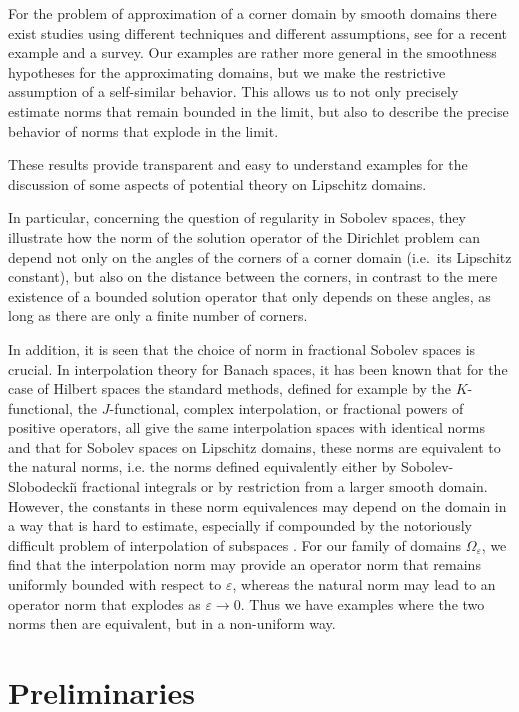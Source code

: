 \documentclass[titlepage,12pt]{amsart}
\theoremstyle{definition}
\theoremstyle{remark}
\numberwithin{equation}{section}
\begin{document}
For the problem of approximation of a corner domain by smooth domains there exist studies using different techniques and different assumptions, see \cite{DanielLabrunieNistor:2024} for a recent example and a survey. Our examples are rather more general in the smoothness hypotheses for the approximating domains, but we make the restrictive assumption of a self-similar behavior. This allows us to not only precisely estimate norms that remain bounded in the limit, but also to describe the precise behavior of norms that explode in the limit.

These results provide transparent and easy to understand examples for the discussion of some aspects of potential theory on Lipschitz domains. 

In particular, concerning the question of regularity in Sobolev spaces, they illustrate how the norm of the solution operator of the Dirichlet problem can depend not only on the angles of the corners of a corner domain (i.e.\ its Lipschitz constant), but also on the distance between the corners, in contrast to the mere existence of a bounded solution operator that only depends on these angles, as long as there are only a finite number of corners.

In addition, it is seen that the choice of norm in fractional Sobolev spaces is crucial. 
In interpolation theory for Banach spaces, it has been known \cite{Ch-WHewettMoiola:2015,Ch-WHewettMoiola:2022} that for the case of Hilbert spaces the standard methods, defined for example by the $K$-functional, the $J$-functional, complex interpolation, or fractional powers of positive operators, all give the same interpolation spaces with identical norms and that for Sobolev spaces on Lipschitz domains, these norms are equivalent to the natural norms, i.e. the norms defined equivalently either by Sobolev-Slobodecki\u{\i} fractional integrals or by restriction from a larger smooth domain. However, the constants in these norm equivalences may depend on the domain in a way that is hard to estimate, especially if compounded by the notoriously difficult problem of interpolation of subspaces \cite{Asekritova:2015,Zerulla:2022}. For our family of domains $\Omega_{\varepsilon}$, we find that the interpolation norm 
may provide an operator norm that remains uniformly bounded with respect to $\varepsilon$, whereas the natural norm may lead to an operator norm that explodes as $\varepsilon\to0$. Thus we have examples where the two norms then are  equivalent, but in a non-uniform way.

\section{Preliminaries}
\end{document}
